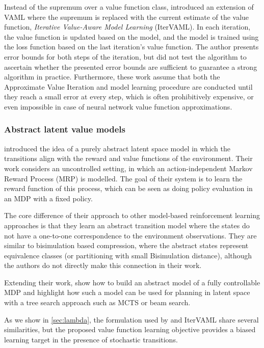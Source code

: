 Instead of the supremum over a value function class, \textcite{itervaml} introduced an extension of VAML where the supremum is replaced with the current estimate of the value function, \emph{Iterative Value-Aware Model Learning} (IterVAML).
In each iteration, the value function is updated based on the model, and the model is trained using the loss function based on the last iteration's value function.
The author presents error bounds for both steps of the iteration, but did not test the algorithm to ascertain whether the presented error bounds are sufficient to guarantee a strong algorithm in practice. 
Furthermore, these work assume that both the Approximate Value Iteration and model learning procedure are conducted until they reach a small error at every step, which is often prohibitively expensive, or even impossible in case of neural network value function approximations.


\subsubsection{Abstract latent value models}

\textcite{silver2017predictron} introduced the idea of a purely abstract latent space model in which the transitions align with the reward and value functions of the environment.
Their work considers an uncontrolled setting, in which an action-independent Markov Reward Process (MRP) is modelled.
The goal of their system is to learn the reward function of this process, which can be seen as doing policy evaluation in an MDP with a fixed policy.

The core difference of their approach to other model-based reinforcement learning approaches is that they learn an abstract transition model where the states do not have a one-to-one correspondence to the environment observations.
They are similar to bisimulation based compression, where the abstract states represent equivalence classes (or partitioning with small Bisimulation distance), although the authors do not directly make this connection in their work.

Extending their work, \textcite{oh2017value} show how to build an abstract model of a fully controllable MDP and highlight how such a model can be used for planning in latent space with a tree search approach such as MCTS \parencite{schrittwieser2020mastering} or beam search.

As we show in \autoref{sec:lambda}, the formulation used by \textcite{silver2017predictron} and IterVAML share several similarities, but the proposed value function learning objective provides a biased learning target in the presence of stochastic transitions.

